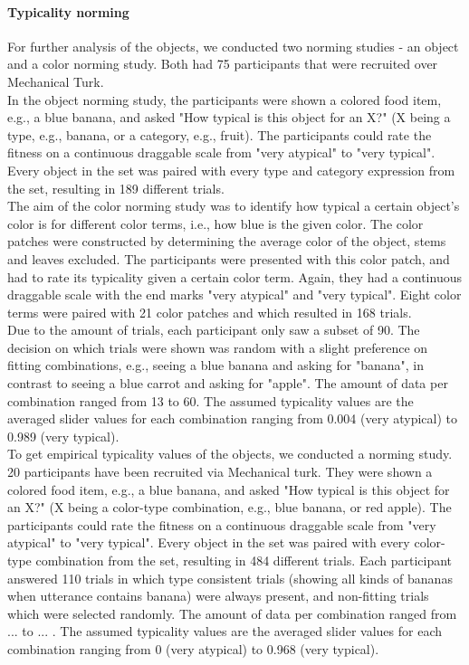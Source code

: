 \documentclass[10pt,letterpaper]{article}
\begin{document}
\paragraph{Typicality norming}
For further analysis of the objects, we conducted two norming studies - an object and a color norming study. Both had 75 participants that were recruited over Mechanical Turk.\\
In the object norming study, the participants were shown a colored food item, e.g., a blue banana, and asked "How typical is this object for an X?" (X being a type, e.g., banana, or a category, e.g., fruit). The participants could rate the fitness on a continuous draggable scale from "very atypical" to "very typical". Every object in the set was paired with every type and category expression from the set, resulting in 189 different trials.\\ 
The aim of the color norming study was to identify how typical a certain object's color is for different color terms, i.e., how blue is the given color. The color patches were constructed by determining the average color of the object, stems and leaves excluded. The participants were presented with this color patch, and had to rate its typicality given a certain color term. Again, they had a continuous draggable scale with the end marks "very atypical" and "very typical". Eight color terms were paired with 21 color patches and which resulted in 168 trials.\\
Due to the amount of trials, each participant only saw a subset of 90. The decision on which trials were shown was random with a slight preference on fitting combinations, e.g., seeing a blue banana and asking for "banana", in contrast to seeing a blue carrot and asking for "apple". The amount of data per combination ranged from 13 to 60. The assumed typicality values are the averaged slider values for each combination ranging from 0.004 (very atypical) to 0.989 (very typical). \\

To get empirical typicality values of the objects, we conducted a norming study. 20 participants have been recruited via Mechanical turk. 
They were shown a colored food item, e.g., a blue banana, and asked "How typical is this object for an X?" (X being a color-type combination, e.g., blue banana, or red apple). The participants could rate the fitness on a continuous draggable scale from "very atypical" to "very typical". Every object in the set was paired with every color-type combination from the set, resulting in 484 different trials. Each participant answered 110 trials in which type consistent trials (showing all kinds of bananas when utterance contains banana) were always present, and non-fitting trials which were selected randomly. The amount of data per combination ranged from ... to ... . The assumed typicality values are the averaged slider values for each combination ranging from 0 (very atypical) to 0.968 (very typical). \\ 
\end{document}
